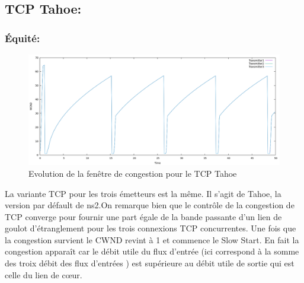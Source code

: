 \documentclass[a4paper,12pt]{article}
\begin{document}
\subsection{TCP Tahoe:}
\subsubsection{Équité:}
\begin{figure}[H]
\centering
\includegraphics[width=16cm]{img/Tahoe.png}
\caption{Evolution de la fenêtre de congestion pour le TCP Tahoe}
\end{figure}
La variante TCP pour les trois émetteurs est la même. Il s'agit de Tahoe, la version par défault de ns2.On remarque bien que le contrôle de la congestion de TCP converge pour fournir une part égale de la bande passante d'un lien de goulot d'étranglement pour les trois connexions TCP concurrentes. Une fois que la congestion survient le CWND revint à 1 et commence le Slow Start. En fait la congestion apparaît car le débit utile du flux d’entrée (ici correspond à la somme des troix débit des flux d'entrées ) est supérieure au débit utile de sortie qui est celle du lien de cœur.
\end{document}
